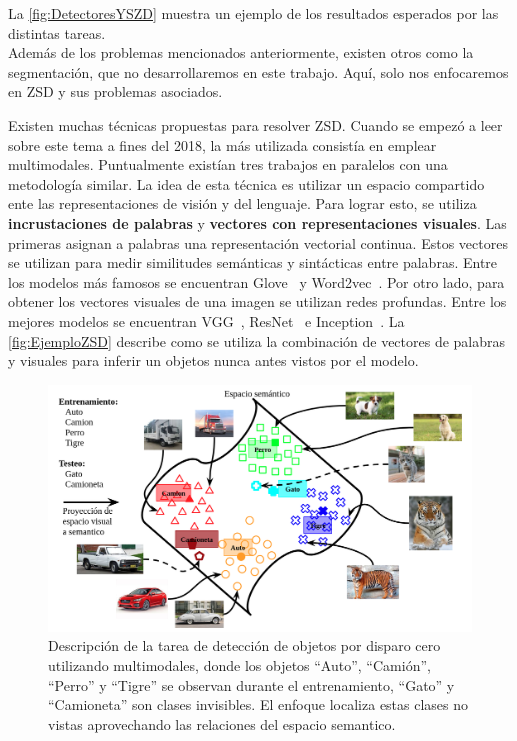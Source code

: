 La \autoref{fig:DetectoresYSZD} muestra un ejemplo de los resultados esperados por las distintas tareas.\\

Además de los problemas mencionados anteriormente, existen otros como la segmentación, que no desarrollaremos en este trabajo. Aquí, solo nos enfocaremos en ZSD y sus problemas asociados.
 
Existen muchas técnicas propuestas para resolver ZSD. Cuando se empezó a leer sobre este tema a fines del 2018, la más utilizada consistía en emplear multimodales. Puntualmente existían tres trabajos en paralelos \cite{rahman2018zero}\cite{zhu2018zero}\cite{bansal2018zero} con una metodología similar. La idea de esta técnica es utilizar un espacio compartido ente las representaciones de visión y del lenguaje. Para lograr esto, se utiliza  \textbf{incrustaciones de palabras} y \textbf{vectores con representaciones visuales}. Las primeras asignan a palabras una representación vectorial continua. Estos vectores se utilizan para medir similitudes semánticas y sintácticas entre palabras. Entre los modelos más famosos se encuentran Glove~\cite{pennington-etal-2014-glove} y Word2vec~\cite{mikolov2013efficient}. Por otro lado, para obtener los vectores visuales de una imagen se utilizan redes profundas. Entre los mejores modelos se encuentran VGG~\cite{simonyan2014very}, ResNet~\cite{resnet} e Inception~\cite{Szegedy_2015_CVPR}. La \autoref{fig:EjemploZSD} describe como se utiliza la combinación de vectores de palabras y visuales para inferir un objetos nunca antes vistos por el modelo.\\

\begin{figure}[]
	\centering
	\includegraphics[width=1\textwidth]{img/Modelo.png}
	\caption{Descripción de la tarea de detección de objetos por disparo cero utilizando multimodales, donde los objetos ``Auto'', ``Camión'', ``Perro'' y ``Tigre'' se observan  durante el entrenamiento,  ``Gato'' y ``Camioneta'' son clases invisibles. El enfoque localiza estas clases no vistas aprovechando las relaciones del espacio semantico.}
	\label{fig:EjemploZSD}
\end{figure}

